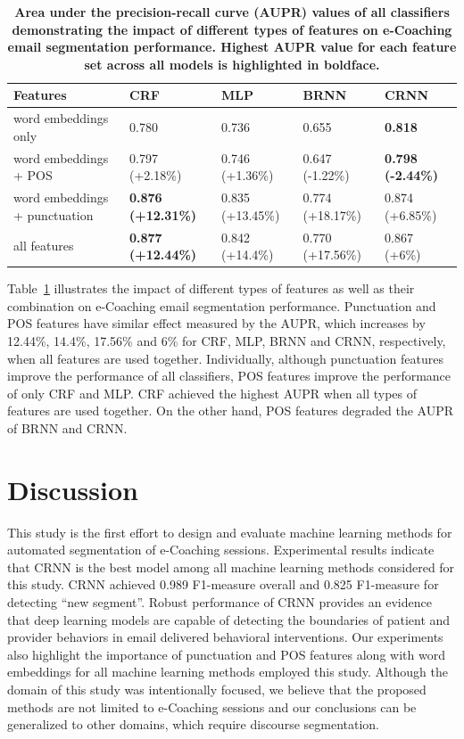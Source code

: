 \documentclass{amia}
\begin{document}
\begin{table}[ht]
\centering
\caption{\textbf{Area under the precision-recall curve (AUPR) values of all classifiers demonstrating the impact of different types of features on e-Coaching email segmentation performance. Highest AUPR value for each feature set across all models is highlighted in boldface.}}
\label{tab:result_aupr}
 \begin{tabular}{|l|l|l|l|l|}
  \hline
\textbf{Features} & \textbf{CRF} & \textbf{MLP}  & \textbf{BRNN} & \textbf{CRNN} \\ \hline      
 word embeddings only & 0.780 & 0.736 & 0.655 & \textbf{0.818} \\ \hline
 word embeddings + POS & 0.797 (+2.18\%) & 0.746 (+1.36\%) & 0.647 (-1.22\%) & \textbf{0.798 (-2.44\%)} \\ \hline
 word embeddings + punctuation & \textbf{0.876 (+12.31\%)} & 0.835 (+13.45\%) & 0.774 (+18.17\%) & 0.874 (+6.85\%) \\ \hline
 all features & \textbf{0.877 (+12.44\%)} & 0.842 (+14.4\%) & 0.770 (+17.56\%) & 0.867 (+6\%) \\ \hline
  \end{tabular}
\end{table}     

Table~\ref{tab:result_aupr} illustrates the impact of different types of features as well as their combination on e-Coaching email segmentation performance. Punctuation and POS features have similar effect measured by the AUPR, which increases by 12.44\%, 14.4\%, 17.56\% and 6\% for CRF, MLP, BRNN and CRNN, respectively, when all features are used together. Individually, although punctuation features improve the performance of all classifiers, POS features improve the performance of only CRF and MLP. CRF achieved the highest AUPR when all types of features are used together. On the other hand, POS features degraded the AUPR of BRNN and CRNN.

\section*{Discussion}
This study is the first effort to design and evaluate machine learning methods for automated segmentation of e-Coaching sessions. Experimental results indicate that CRNN is the best model among all machine learning methods considered for this study. CRNN achieved 0.989 F1-measure overall and 0.825 F1-measure for detecting ``new segment''. Robust performance of CRNN provides an evidence that deep learning models are capable of detecting the boundaries of patient and provider behaviors in email delivered behavioral interventions. Our experiments also highlight the importance of punctuation and POS features along with word embeddings for all machine learning methods employed this study. Although the domain of this study was intentionally focused, we believe that the proposed methods are not limited to e-Coaching sessions and our conclusions can be generalized to other domains, which require discourse segmentation.
\end{document}

